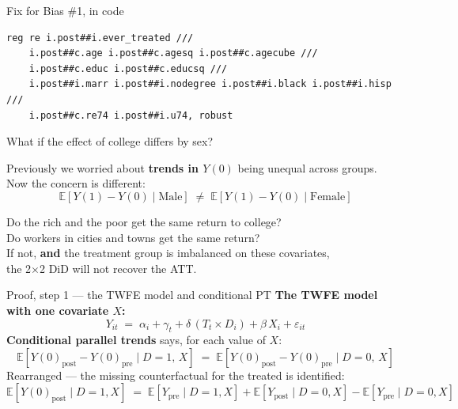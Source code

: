 \documentclass[aspectratio=169,11pt]{beamer}
\begin{document}
\begin{frame}[fragile]{Fix for Bias \#1, in code}
\vspace{0.6em}
\begin{lstlisting}[language={[ANSI]C},basicstyle=\ttfamily\scriptsize]
reg re i.post##i.ever_treated ///
    i.post##c.age i.post##c.agesq i.post##c.agecube ///
    i.post##c.educ i.post##c.educsq ///
    i.post##i.marr i.post##i.nodegree i.post##i.black i.post##i.hisp ///
    i.post##c.re74 i.post##i.u74, robust
\end{lstlisting}
\end{frame}


\begin{frame}{What if the effect of college differs by sex?}
\vspace{0.5em}
\begin{center}
Previously we worried about \textbf{trends in $Y(0)$} being unequal across groups.\\[0.5em]
Now the concern is different:
\[
\mathbb{E}[Y(1) - Y(0)\mid \text{Male}] \;\neq\; \mathbb{E}[Y(1) - Y(0)\mid \text{Female}]
\]
\end{center}
\vspace{0.4em}
\begin{center}\color{warmgray}\small
Do the rich and the poor get the same return to college?\\
Do workers in cities and towns get the same return?\\[0.4em]
If not, \textbf{and} the treatment group is imbalanced on these covariates,\\
the 2$\times$2 DiD will not recover the ATT.
\end{center}
\end{frame}

\begin{frame}{Proof, step 1 --- the TWFE model and conditional PT}
\vspace{0.3em}
\textbf{The TWFE model with one covariate $X$:}
\[
Y_{it} \;=\; \alpha_i + \gamma_t + \delta\,(T_t \times D_i) + \beta\, X_i + \varepsilon_{it}
\]
\textbf{Conditional parallel trends} says, for each value of $X$:
\[
\mathbb{E}[Y(0)_{\text{post}} - Y(0)_{\text{pre}} \mid D{=}1,\, X]
\;=\;
\mathbb{E}[Y(0)_{\text{post}} - Y(0)_{\text{pre}} \mid D{=}0,\, X]
\]
Rearranged --- the missing counterfactual for the treated is identified:
\[
\mathbb{E}[Y(0)_{\text{post}} \mid D{=}1, X]
\;=\;
\mathbb{E}[Y_{\text{pre}} \mid D{=}1, X]
+ \mathbb{E}[Y_{\text{post}} \mid D{=}0, X]
- \mathbb{E}[Y_{\text{pre}} \mid D{=}0, X]
\]
\end{frame}
\end{document}
